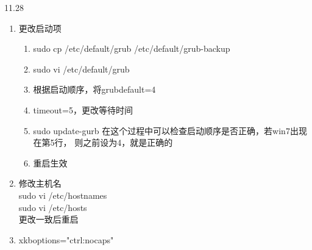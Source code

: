 \documentclass[UTF8]{ctexart}
\begin{document}
11.28
\begin{enumerate}
    \item
        更改启动项
        \begin{enumerate}
            \item
                sudo cp /etc/default/grub /etc/default/grub-backup
            \item
                sudo vi /etc/default/grub
            \item
                根据启动顺序，将grubdefault=4
            \item
                timeout=5，更改等待时间
            \item
                sudo update-gurb 
                在这个过程中可以检查启动顺序是否正确，若win7出现在第5行，
                则之前设为4，就是正确的
            \item
                重启生效 
        \end{enumerate}
    \item
        修改主机名
        \\ sudo vi /etc/hostnames
        \\ sudo vi /etc/hosts
        \\ 更改一致后重启
    \item
	xkboptions="ctrl:nocaps"
\end{enumerate}
\end{document}

